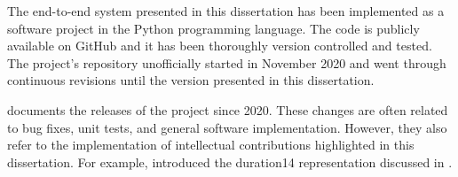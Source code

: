 
The end-to-end system presented in this dissertation has
been implemented as a software project in the Python
programming language. The code is publicly available on
GitHub and it has been thoroughly version controlled and
tested. The project's repository unofficially started in
November 2020 and went through continuous revisions until
the version presented in this dissertation.

 documents the releases of the project
since 2020. These changes are often related to bug fixes,
unit tests, and general software implementation. However,
they also refer to the implementation of intellectual
contributions highlighted in this dissertation. For example,
 introduced the \gls{duration14} representation
discussed in .

